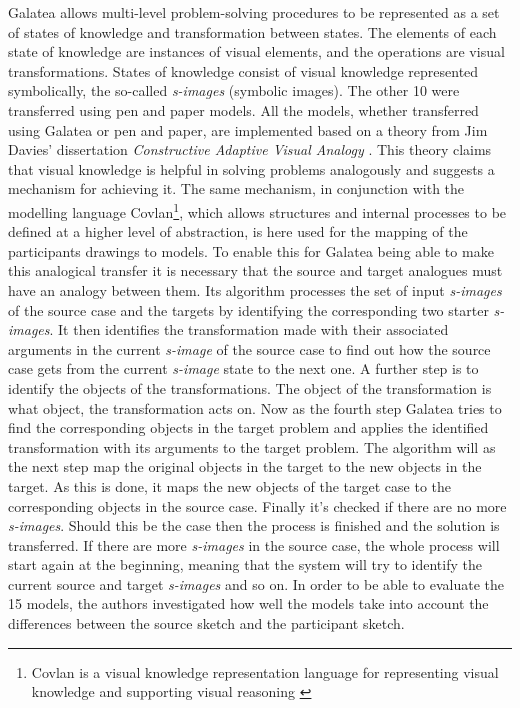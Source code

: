 \documentclass[12pt]{article}
\begin{document}
Galatea allows multi-level problem-solving procedures to be represented as a set of states of knowledge and transformation between states. The elements of each state of knowledge are instances of visual elements, and the operations are visual transformations.  States of knowledge consist of visual knowledge represented symbolically, the so-called \textit{s-images} (symbolic images). 
The other 10 were transferred using pen and paper models. All the models, whether transferred using Galatea or pen and paper, are implemented based on a theory from Jim Davies' dissertation \textit{Constructive Adaptive Visual Analogy} \cite{davies2004constructive}. This theory claims that visual knowledge is helpful in solving problems analogously and suggests a mechanism for achieving it. The same mechanism, in conjunction with the modelling language Covlan\footnote{Covlan is a visual knowledge representation language for representing visual knowledge and supporting visual reasoning \cite{davies2007transfer}}, which allows structures and internal processes to be defined at a higher level of abstraction, is here used for the mapping of the participants drawings to models. To enable this for Galatea being able to make this analogical transfer it is necessary that the source and target analogues must have an analogy between them. Its algorithm processes the set of input \textit{s-images} of the source case and the targets by identifying the corresponding two starter \textit{s-images}. It then identifies the transformation made with their associated arguments in the current \textit{s-image} of the source case to find out how the source case gets from the current \textit{s-image} state to the next one. A further step is to identify the objects of the transformations. The object of the transformation is what object, the transformation acts on. Now as the fourth step Galatea tries to find the corresponding objects in the target problem and applies the identified transformation with its arguments to the target problem. The algorithm will as the next step map the original objects in the target to the new objects in the target. As this is done, it maps the new objects of the target case to the corresponding objects in the source case. Finally it's checked if there are no more \textit{s-images}. Should this be the case then the process is finished and the solution is transferred. If there are more \textit{s-images} in the source case, the whole process will start again at the beginning, meaning that the system will try to identify the current source and target \textit{s-images} and so on. In order to be able to evaluate the 15 models, the authors investigated how well the models take into account the differences between the source sketch and the participant sketch. 
\end{document}
